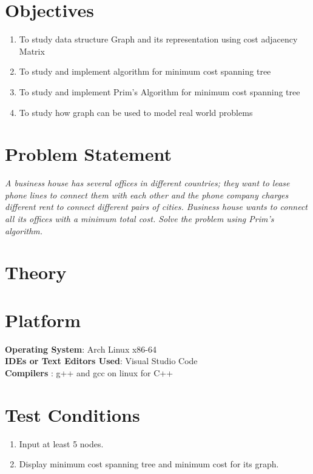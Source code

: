 \documentclass[11pt]{article}
\begin{document}
\tableofcontents
\thispagestyle{empty}
\clearpage

\setcounter{page}{1}

\section{Objectives}
\begin{enumerate}
    \item To study data structure Graph and its representation using cost adjacency Matrix
    \item To study and implement algorithm for minimum cost spanning tree
    \item To study and implement Prim's Algorithm for minimum cost spanning tree
    \item To study how graph can be used to model real world problems
\end{enumerate}

\section{Problem Statement}
\textit{A business house has several offices in different countries; they want to lease phone
    lines to connect them with each other and the phone company charges different rent to
    connect different pairs of cities. Business house wants to connect all its offices with a
    minimum total cost. Solve the problem using Prim's algorithm.}
\section{Theory}


\section{Platform}
\textbf{\textbf{Operating System}}: Arch Linux x86-64 \\
\textbf{\textbf{IDEs or Text Editors Used}}: Visual Studio Code\\
\textbf{\textbf{Compilers} }: g++ and gcc on linux for C++\\

\section{Test Conditions}
\begin{enumerate}
    \item Input at least 5 nodes.
    \item Display minimum cost spanning tree and minimum cost for its graph.
\end{enumerate}
\end{document}

